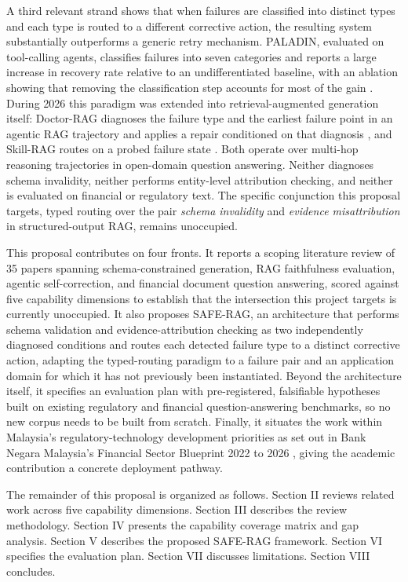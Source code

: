 \documentclass[10pt,twocolumn,letterpaper]{article}
\begin{document}
A third relevant strand shows that when failures are classified into distinct types and each type is routed to a different corrective action, the resulting system substantially outperforms a generic retry mechanism. PALADIN, evaluated on tool-calling agents, classifies failures into seven categories and reports a large increase in recovery rate relative to an undifferentiated baseline, with an ablation showing that removing the classification step accounts for most of the gain \cite{paladin}. During 2026 this paradigm was extended into retrieval-augmented generation itself: Doctor-RAG diagnoses the failure type and the earliest failure point in an agentic RAG trajectory and applies a repair conditioned on that diagnosis \cite{doctorrag}, and Skill-RAG routes on a probed failure state \cite{skillrag}. Both operate over multi-hop reasoning trajectories in open-domain question answering. Neither diagnoses schema invalidity, neither performs entity-level attribution checking, and neither is evaluated on financial or regulatory text. The specific conjunction this proposal targets, typed routing over the pair \emph{schema invalidity} and \emph{evidence misattribution} in structured-output RAG, remains unoccupied.

This proposal contributes on four fronts. It reports a scoping literature review of 35 papers spanning schema-constrained generation, RAG faithfulness evaluation, agentic self-correction, and financial document question answering, scored against five capability dimensions to establish that the intersection this project targets is currently unoccupied. It also proposes SAFE-RAG, an architecture that performs schema validation and evidence-attribution checking as two independently diagnosed conditions and routes each detected failure type to a distinct corrective action, adapting the typed-routing paradigm to a failure pair and an application domain for which it has not previously been instantiated. Beyond the architecture itself, it specifies an evaluation plan with pre-registered, falsifiable hypotheses built on existing regulatory and financial question-answering benchmarks, so no new corpus needs to be built from scratch. Finally, it situates the work within Malaysia's regulatory-technology development priorities as set out in Bank Negara Malaysia's Financial Sector Blueprint 2022 to 2026 \cite{bnm}, giving the academic contribution a concrete deployment pathway.

The remainder of this proposal is organized as follows. Section II reviews related work across five capability dimensions. Section III describes the review methodology. Section IV presents the capability coverage matrix and gap analysis. Section V describes the proposed SAFE-RAG framework. Section VI specifies the evaluation plan. Section VII discusses limitations. Section VIII concludes.
\end{document}
